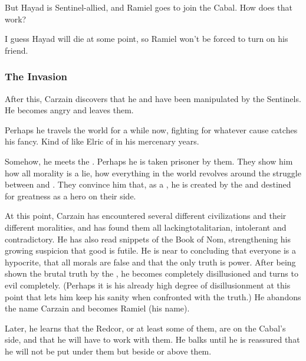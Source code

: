 But Hayad is Sentinel-allied, and Ramiel goes to join the Cabal. 
How does that work? 

I guess Hayad will die at some point, so Ramiel won't be forced to turn on his friend. 







\subsubsection{The \Bane{} Invasion}

After this, Carzain discovers that he and \Belzir{} have been manipulated by the Sentinels. He becomes angry and leaves them. 

Perhaps he travels the world for a while now, fighting for whatever cause catches his fancy. Kind of like Elric of \Melnibone{} in his mercenary years. 

Somehow, he meets the \banes. Perhaps he is taken prisoner by them. They show him how all morality is a lie, how everything in the world revolves around the struggle between \dragons{} and \banes. They convince him that, as a \Malach, he is created by the \banes{} and destined for greatness as a hero on their side. 

At this point, Carzain has encountered several different civilizations and their different moralities, and has found them all lacking\dash{}totalitarian, intolerant and contradictory. He has also read snippets of the Book of Nom, strengthening his growing suspicion that good is futile. He is near to concluding that everyone is a hypocrite, that all morals are false and that the only truth is power. 
After being shown the brutal truth by the \banes, he becomes completely disillusioned and turns to evil completely. (Perhaps it is his already high degree of disillusionment at this point that lets him keep his sanity when confronted with the truth.) 
He abandons the name Carzain \Shireyo{} and becomes Ramiel (his \Malach{} name). 

Later, he learns that the Redcor, or at least some of them, are on the Cabal's side, and that he will have to work with them. He balks until he is reassured that he will not be put under them but beside or above them. 

